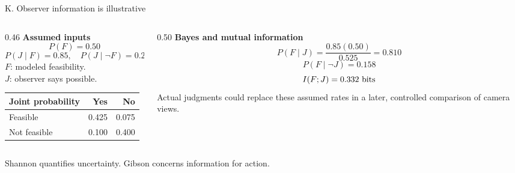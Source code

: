 \begin{frame}{K. Observer information is illustrative}
\begin{columns}[T,onlytextwidth]
\begin{column}{0.46\textwidth}
\textbf{Assumed inputs}
\[
P(F)=0.50
\]
\[
P(J\mid F)=0.85,\quad P(J\mid\neg F)=0.20
\]
\small $F$: modeled feasibility.\\
$J$: observer says possible.
\par\medskip
\centering
\begin{tabular}{@{}lrr@{}}\toprule
Joint probability & Yes & No\\\midrule
Feasible & 0.425 & 0.075\\
Not feasible & 0.100 & 0.400\\\bottomrule
\end{tabular}\par
\end{column}
\begin{column}{0.50\textwidth}
\textbf{Bayes and mutual information}
\[
P(F\mid J)=\frac{0.85(0.50)}{0.525}=0.810
\]
\[
P(F\mid\neg J)=0.158
\]
\[
I(F;J)=0.332\ {\rm bits}
\]
\small Actual judgments could replace these assumed rates in a later, controlled comparison of camera views.
\end{column}
\end{columns}
\par\bigskip
\begin{ibox}
Shannon quantifies uncertainty. Gibson concerns information for action.
\end{ibox}
\end{frame}
